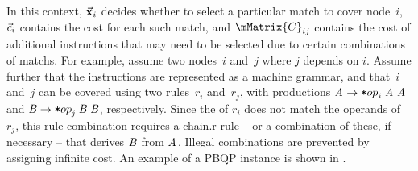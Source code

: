 In this context, $\mVector{\mVar{x}}_i$ decides whether to select a particular
\gls{match} to cover \gls{node}~$i$, $\vec{c}_i$ contains the cost for each
such \gls{match}, and $\mMatrix{C}_{ij}$ contains the cost of additional
\glspl{instruction} that may need to be selected due to certain combinations of
\glspl{match}.
%
For example, assume two nodes~$i$ and~$j$ where $j$ depends on
$i$\hspace{-.8pt}.
%
Assume further that the \glspl{instruction} are represented as a
 \gls{machine grammar}, and that~$i$ and~$j$ can be
covered using two \glspl{rule}~$r_i$ and~$r_j$, with \glspl{production}
\mbox{$\mNT{A} \rightarrow \irCode*{op}_{\mathit{i}} \; \mNT{A} \; \mNT{A}$} and
\mbox{$\mNT{B} \rightarrow \irCode*{op}_{\mathit{j}} \; \mNT{B} \; \mNT{B}$},
respectively.
%
Since the  of $r_i$ does not match the operands of $r_j$,
this \gls{rule} combination requires a \gls{chain.r} \gls{rule} -- or a
combination of these, if necessary -- that derives $\mNT{B}$ from $\mNT{A}$.
%
Illegal combinations are prevented by assigning infinite cost.
%
An example of a \gls{PBQP} instance is shown in .

